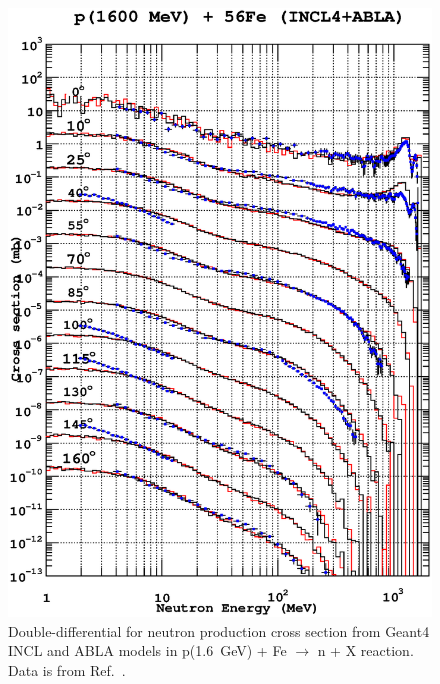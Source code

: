 \documentclass[a4paper]{jpconf}
\begin{document}
\begin{figure}
\begin{center}
\includegraphics[scale=0.70]{images/proton1600MeVFe.eps}
\caption{\label{fig:neutronFe}Double-differential for neutron production cross section
    from Geant4 INCL and ABLA models in p(1.6~GeV) + Fe $\rightarrow$ n + X reaction.
Data is from Ref.~\cite{data}.}

\end{center}

\end{figure}
\end{document}
